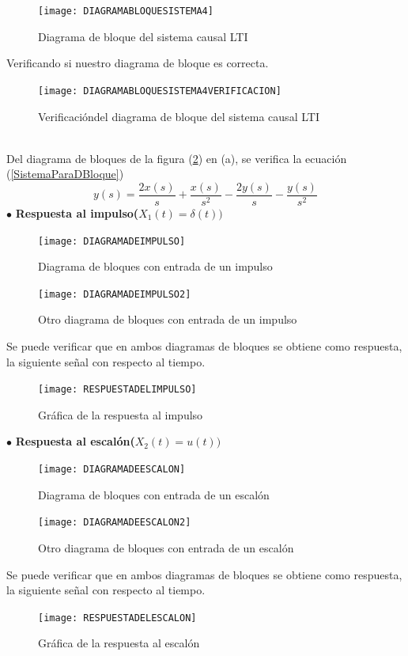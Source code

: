 \documentclass[11pt,a4paper]{article}
\begin{document}
{{\begin{enumerate}
	\begin{figure}[h]
	\centering
	\texttt{[image: DIAGRAMABLOQUESISTEMA4]} 
	\caption{Diagrama de bloque del sistema causal LTI}
\label{DIAGRAMABLOQUESISTEMA4}
\end{figure}
	
	Verificando si nuestro diagrama de bloque es correcta.
	\begin{figure}[h]
	\centering
	\texttt{[image: DIAGRAMABLOQUESISTEMA4VERIFICACION]} 
	\caption{Verificacióndel diagrama de bloque del sistema causal LTI}
\label{DIAGRAMABLOQUESISTEMA4VERIFICACION}
\end{figure}\\
	Del diagrama de bloques de la figura (\ref{DIAGRAMABLOQUESISTEMA4VERIFICACION})
en (a), se verifica la ecuación (\ref{SistemaParaDBloque})\\
	$$y(s)= \dfrac{2x(s)}{s}+ \dfrac{x(s)}{s^2}- \dfrac{2y(s)}{s}- \dfrac{y(s)}{s^2}$$
	\newpage
 	$\bullet$ \textbf{Respuesta al impulso($X_1(t)=\delta (t))$}\\
	
	\begin{figure}[h]
	\centering
	\texttt{[image: DIAGRAMADEIMPULSO]} 
	\caption{Diagrama de bloques con entrada de un impulso}
\label{DIAGRAMADEIMPULSO}
\end{figure}
\begin{figure}[h]
	\centering
	\texttt{[image: DIAGRAMADEIMPULSO2]} 
	\caption{Otro diagrama de bloques con entrada de un impulso}
\label{DIAGRAMADEIMPULSO2}
\end{figure}
	Se puede verificar que en ambos diagramas de bloques se obtiene como respuesta, la siguiente señal con respecto al tiempo.
	\begin{figure}[h]
	\centering
	\texttt{[image: RESPUESTADELIMPULSO]} 
	\caption{Gráfica de la respuesta al impulso}
\label{RESPUESTADELIMPULSO}
\end{figure}
	\newpage
	
	$\bullet$ \textbf{Respuesta al escalón($X_2(t)= u(t))$}\\
	
	\begin{figure}[h]
	\centering
	\texttt{[image: DIAGRAMADEESCALON]} 
	\caption{Diagrama de bloques con entrada de un escalón}
\label{DIAGRAMADEESCALON}
\end{figure}
\begin{figure}[h]
	\centering
	\texttt{[image: DIAGRAMADEESCALON2]} 
	\caption{Otro diagrama de bloques con entrada de un escalón}
\label{DIAGRAMADEESCALON2}
\end{figure}
	Se puede verificar que en ambos diagramas de bloques se obtiene como respuesta, la siguiente señal con respecto al tiempo.
	\begin{figure}[h]
	\centering
	\texttt{[image: RESPUESTADELESCALON]} 
	\caption{Gráfica de la respuesta al escalón}
\label{RESPUESTADELESCALON}
\end{figure}
	\newpage
	

\end{enumerate}}}
\end{document}
